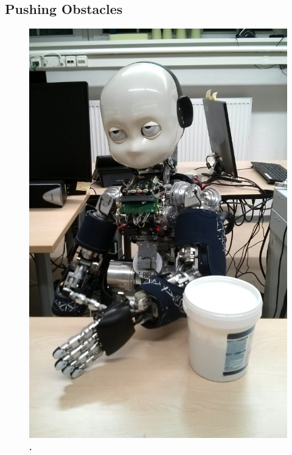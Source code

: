 
\subsection{Pushing Obstacles}
\label{sec:results:exp1}

    \begin{figure}
		\centering
		\includegraphics[width=.99\linewidth]{robertoIROS/fig/taskPush}
		\caption{\textbf{. }}
		\label{fig:pushSetup}
    \end{figure}

